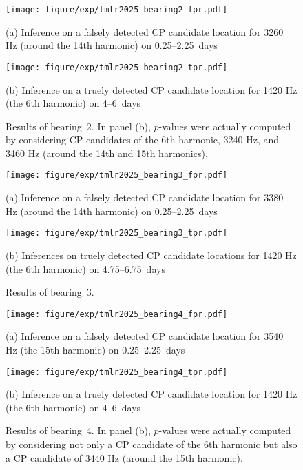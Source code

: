 \begin{figure}[t]
  \centering
  \begin{minipage}[t]{0.4\hsize}
    \centering
    \texttt{[image: figure/exp/tmlr2025\_bearing2\_fpr.pdf]}
    \caption*{(a) Inference on a falsely detected CP candidate location for 3260 Hz (around the 14th harmonic) on 0.25--2.25~days}
  \end{minipage}
  \hfill
  \begin{minipage}[t]{0.4\hsize}
    \centering
    \texttt{[image: figure/exp/tmlr2025\_bearing2\_tpr.pdf]}
    \caption*{(b) Inference on a truely detected CP candidate location for 1420 Hz (the 6th harmonic) on 4--6~days}
  \end{minipage}
  \caption{Results of bearing~2. In panel (b), $p$-values were actually computed by considering CP candidates of the 6th harmonic, 3240 Hz, and 3460 Hz (around the 14th and 15th harmonics).}
  \label{fig_bearing2}
\end{figure}

\begin{figure}[t]
  \centering
  \vspace{1mm}
  \begin{minipage}[t]{0.4\hsize}
    \centering
    \texttt{[image: figure/exp/tmlr2025\_bearing3\_fpr.pdf]}
    \caption*{(a) Inference on a falsely detected CP candidate location for 3380 Hz (around the 14th harmonic) on 0.25--2.25~days}
  \end{minipage}
  \hfill
  \begin{minipage}[t]{0.4\hsize}
    \centering
    \texttt{[image: figure/exp/tmlr2025\_bearing3\_tpr.pdf]}
    \caption*{(b) Inferences on truely detected CP candidate locations for 1420 Hz (the 6th harmonic) on 4.75--6.75~days}
  \end{minipage}
  \caption{Results of bearing~3.}
  \label{fig_bearing3}
\end{figure}

\begin{figure}[H]
  \centering
  \vspace{-1mm}
  \begin{minipage}[t]{0.4\hsize}
    \centering
    \texttt{[image: figure/exp/tmlr2025\_bearing4\_fpr.pdf]}
    \caption*{(a) Inference on a falsely detected CP candidate location for 3540 Hz (the 15th harmonic) on 0.25--2.25~days}
  \end{minipage}  
  \hfill
  \begin{minipage}[t]{0.4\hsize}
    \centering
    \texttt{[image: figure/exp/tmlr2025\_bearing4\_tpr.pdf]}
    \caption*{(b) Inference on a truely detected CP candidate location for 1420 Hz (the 6th harmonic) on 4--6~days}
  \end{minipage}  
  \caption{Results of bearing~4. In panel (b), $p$-values were actually computed by considering not only a CP candidate of the 6th harmonic but also a CP candidate of 3440 Hz (around the 15th harmonic).}
  \label{fig_bearing4}
\end{figure}
